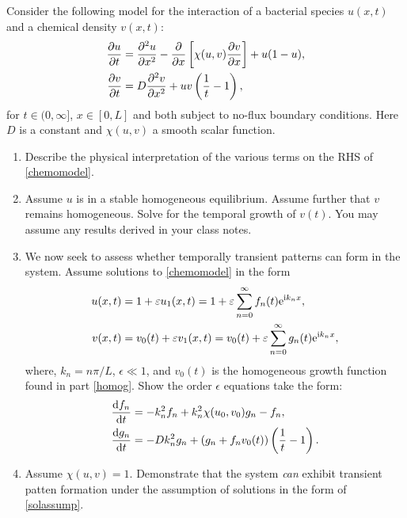 \documentclass[a4paper, 12pt]{article}
\begin{document}
\begin{enumerate}[label={\bf \arabic{*}.\;}, ref={\arabic{*}},itemsep=3ex, left=0ex]
    {
      Consider the following model for the interaction of a bacterial species $u(x,t)$ and a chemical density $v(x,t)$:
      \begin{subequations}
        \label{chemomodel}
        \begin{align}
          \pd{u}{t} &= \pdd{u}{x} - \pd{}{x}\left[\chi(u,v)\pd{v}{x}\right] + u(1-u),\\
          \pd{v}{t} &=D\pdd{v}{x} + uv\left(\frac{1}{t} -1\right),
        \end{align}
      \end{subequations}
      for $t\in(0,\infty]$, $x\in[0,L]$ and both subject to no-flux boundary conditions. Here $D$ is a constant and $\chi(u,v)$ a smooth  scalar function.
      \begin{enumerate}[label=(\alph*)]
        \item{Describe the physical interpretation of the various terms on the RHS of \cref{chemomodel}.
          }
        \item{\label{homog}
            Assume $u$ is in a stable homogeneous equilibrium. Assume further that $v$ remains homogeneous. Solve for the temporal growth of $v(t)$. You may assume any results derived in your class notes.
          }
        \item{
            We now seek to assess whether temporally transient patterns can form in the system. Assume solutions to \cref{chemomodel}  in the form
            \begin{subequations}
              \label{solassump}
              \begin{align}
                u(x,t) &= 1 + \varepsilon u_1(x,t) = 1+  \varepsilon\sum_{n=0}^{\infty}f_n(t)\mathrm{e}^{\mathrm{i} k_nx},\\
                v(x,t) &= v_0(t) + \varepsilon v_1(x,t)= v_0(t)+  \varepsilon\sum_{n=0}^{\infty}g_n(t)\mathrm{e}^{\mathrm{i} k_n x},
              \end{align}
            \end{subequations}
            where, $k_n=n\pi/L$,  $\epsilon\ll1$, and $v_0(t)$ is the homogeneous growth function found in part \ref{homog}. Show the order $\epsilon$ equations take the form:
            \begin{align*}
              \fd{f_n}{t} &= -k_n^2 f_n + k_n^2\chi(u_0,v_0)g_n  - f_n,\\
              \fd{g_n}{t} &= -Dk_n^2 g_n +\left(g_n +f_n v_0(t)\right)\left(\frac{1}{t}-1\right).
            \end{align*}
          }
        \item{
            Assume $\chi(u,v)=1$. Demonstrate that the system \emph{can} exhibit  transient patten formation under the assumption of solutions in the form of \cref{solassump}.

}
\end{enumerate}}
\end{enumerate}
\end{document}
